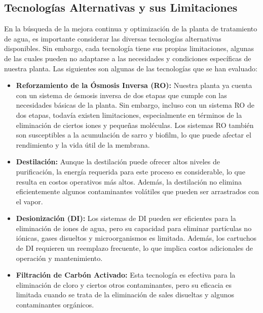 \subsection{Tecnologías Alternativas y sus Limitaciones}

En la búsqueda de la mejora continua y optimización de la planta de tratamiento de agua,
es importante considerar las diversas tecnologías alternativas disponibles.
Sin embargo, cada tecnología tiene sus propias limitaciones, algunas de las
cuales pueden no adaptarse a las necesidades y condiciones específicas de nuestra planta.
Las siguientes son algunas de las tecnologías que se han evaluado:

\begin{itemize}
      \item \textbf{Reforzamiento de la Ósmosis Inversa (RO):}  Nuestra planta ya cuenta con
            un sistema de ósmosis inversa de dos etapas que cumple con las necesidades
            básicas de la planta. Sin embargo, incluso con un sistema RO de dos etapas,
            todavía existen limitaciones, especialmente en términos de la eliminación de
            ciertos iones y pequeñas moléculas. Los sistemas RO también son susceptibles a
            la acumulación de sarro y biofilm, lo que puede afectar el rendimiento y
            la vida útil de la membrana.

      \item \textbf{Destilación:}  Aunque la destilación puede ofrecer altos niveles de
            purificación, la energía requerida para este proceso es considerable,
            lo que resulta en costos operativos más altos. Además, la destilación
            no elimina eficientemente algunos contaminantes volátiles que pueden ser arrastrados con el vapor.

      \item \textbf{Desionización (DI): } Los sistemas de DI pueden ser eficientes para
            la eliminación de iones de agua, pero su capacidad para eliminar
            partículas no iónicas, gases disueltos y microorganismos es limitada.
            Además, los cartuchos de DI requieren un reemplazo frecuente, lo que
            implica costos adicionales de operación y mantenimiento.

      \item \textbf{Filtración de Carbón Activado:}  Esta tecnología es efectiva para la
            eliminación de cloro y ciertos otros contaminantes, pero su eficacia es
            limitada cuando se trata de la eliminación de sales disueltas y
            algunos contaminantes orgánicos.

\end{itemize}

